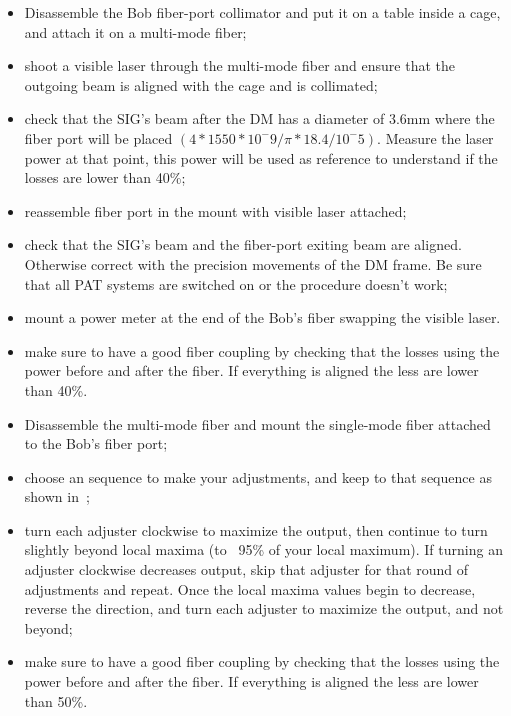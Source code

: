 \begin{itemize}
  \item Disassemble the Bob fiber-port collimator and put it on a table inside a cage, and attach it on a multi-mode fiber;
  \item shoot a visible laser through the multi-mode fiber and ensure that the outgoing beam is aligned with the cage and is collimated;
  \item check that the SIG's beam after the DM has a diameter of 3.6mm where the fiber port will be placed $(4 * 1550 * 10^-9 / \pi * 18.4 / 10^-5)$. Measure the laser power at that point, this power will be used as reference to understand if the losses are lower than 40\%;
  \item reassemble fiber port in the mount with visible laser attached;
  \item check that the SIG's beam and the fiber-port exiting beam are aligned. Otherwise correct with the precision movements of the DM frame. Be sure that all PAT systems are switched on or the procedure doesn't work;
  \item mount a power meter at the end of the Bob's fiber swapping the visible laser.
  \item make sure to have a good fiber coupling by checking that the losses using the power before and after the fiber. If everything is aligned the less are lower than 40\%.
\end{itemize}

\begin{itemize}
  \item Disassemble the multi-mode fiber and mount the single-mode fiber attached to the Bob's fiber port;
  \item choose an sequence to make your adjustments, and keep to that sequence as shown in~;
  \item turn each adjuster clockwise to maximize the output, then continue to turn slightly beyond local maxima (to ~95\% of your local maximum). If turning an adjuster clockwise decreases output, skip that adjuster for that round of adjustments and repeat. Once the local maxima values begin to decrease, reverse the direction, and turn each adjuster to maximize the output, and not beyond;
  \item make sure to have a good fiber coupling by checking that the losses using the power before and after the fiber. If everything is aligned the less are lower than 50\%.
\end{itemize}
